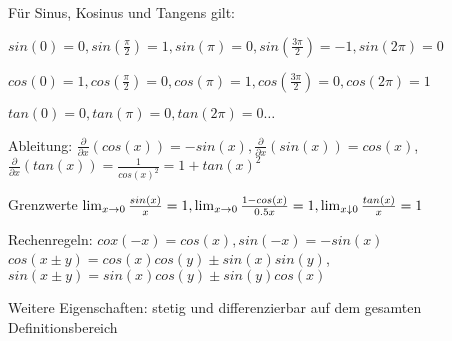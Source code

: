 \documentclass[]{article}
\begin{document}
\begin{definition}[Eigenschaften]
	Für Sinus, Kosinus und Tangens gilt:
	\begin{description}[noitemsep]
		\item $sin(0) = 0, sin( \frac{\pi}{2})=1, sin(\pi) = 0, sin(\frac{3 \pi}{2}) = -1, sin(2 \pi) = 0$
		\item $cos(0) = 1, cos (\frac{\pi}{2}) = 0, cos (\pi) = 1, cos(\frac{3 \pi}{2}) = 0, cos (2 \pi) = 1$
		\item $tan(0) = 0, tan(\pi) = 0, tan(2 \pi) = 0 \dots$
		\item Ableitung: $\frac{\partial}{\partial x}(cos(x)) = -sin(x), \frac{\partial}{\partial x}(sin(x)) = cos(x)$, \\ $\frac{\partial}{\partial x}(tan(x)) = \frac{1}{cos(x)^2} = 1 + tan(x)^2$
		\item Grenzwerte $\lim_{x \rightarrow 0} \frac{sin(x)}{x} = 1, \lim_{x \rightarrow 0} \frac{1 - cos(x)}{0.5x} = 1, \lim_{x \downarrow 0} \frac{tan (x)}{x} = 1$
		\item Rechenregeln: $cox(-x) = cos(x), sin(-x) = -sin(x)$ \\ $cos(x \pm y) = cos(x)cos(y) \pm sin(x)sin(y)$, \\ $sin(x \pm y) = sin(x)cos(y) \pm sin(y)cos(x)$
		\item Weitere Eigenschaften: stetig und differenzierbar auf dem gesamten Definitionsbereich
	\end{description}
\end{definition}

\pagebreak
\end{document}
